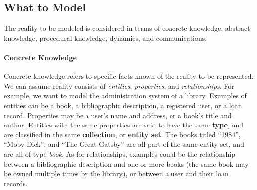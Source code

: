 \subsection{What to Model}
The reality to be modeled is considered in terms of concrete knowledge, abstract knowledge, procedural knowledge, dynamics, and communications.

\paragraph{Concrete Knowledge} Concrete knowledge refers to specific facts known of the reality to be represented. We can assume reality consists of \textit{entities}, \textit{properties}, and \textit{relationships}.
For example, we want to model the administration system of a library. Examples of entities can be a book, a bibliographic description, a registered user, or a loan record. Properties may be a user's name and address, or a book's title and author. Entities with the same properties are said to have the same \textbf{type}, and are classified in the same \textbf{collection}, or \textbf{entity set}. The books titled ``1984'', ``Moby Dick'', and ``The Great Gatsby'' are all part of the same entity set, and are all of type \textit{book}. As for relationships, examples could be the relationship between a bibliographic description and one or more books (the same book may be owned multiple times by the library), or between a user and their loan records.

